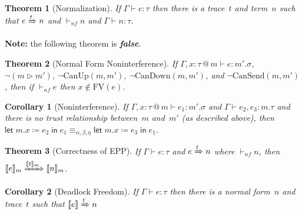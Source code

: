 \documentclass{article}
\makeatletter
\newtheorem{thm}{Theorem}
\newtheorem{cor}{Corollary}
\theoremstyle{definition}
\newcommand{\letl}[4]{\textsf{let}\;#1.#2 \mathrel{\coloneqq} #3 \mathrel{\textsf{in}} #4}
\newcommand{\at}{\ensuremath{\mathrel{@}}}
\newcommand{\reps}[2]{#1 \mathrel{\vartriangleright} #2}
\newcommand{\cansend}[2]{\text{CanSend}(#1, #2)}
\newcommand{\candown}[2]{\text{CanDown}(#1, #2)}
\newcommand{\canup}[2]{\text{CanUp}(#1, #2)}
\makeatother
\begin{document}
\begin{thm}[Normalization]
  If $\Gamma \vdash e : \tau$ then there is a trace~$t$ and term~$n$ such that $e \xRightarrow{t} n$ and $\vdash_{nf} n$ and $\Gamma \vdash n : \tau$.
\end{thm}

\noindent\textbf{Note:} the following theorem is \emph{\textbf{false}}.
\vspace{-0.5em}
\begin{thm}[Normal Form Noninterference]
  If\/ $\Gamma, x : \tau \at m \vdash e : m'.\sigma$, $\lnot (\reps{m}{m'})$, $\lnot\canup{m}{m'}$, $\lnot\candown{m}{m'}$, and $\lnot\cansend{m}{m'}$, then if\/ $\vdash_{nf} e$ then $x \not\in \text{FV}(e)$.
\end{thm}


\begin{cor}[Noninterference]
  If\/ $\Gamma, x : \tau \at m \vdash e_1 : m'.\sigma$ and $\Gamma \vdash e_2, e_3 : m.\tau$ and there is no trust relationship between~$m$ and~$m'$ (as described above), then $\letl{m}{x}{e_2}{e_1} \equiv_{\alpha, \beta, \eta} \letl{m}{x}{e_3}{e_1}$.
\end{cor}

\begin{thm}[Correctness of EPP]
  If\/ $\Gamma \vdash e : \tau$ and $e \xRightarrow{t} n$ where\/ $\vdash_{nf} n$, then $\llbracket e \rrbracket_m \xRightarrow{\llbracket t \rrbracket_m} \llbracket n \rrbracket_m$.
\end{thm}

\begin{cor}[Deadlock Freedom]
  If\/ $\Gamma \vdash e : \tau$ then there is a normal form~$n$ and trace~$t$ such that $\llbracket e \rrbracket \xRightarrow{t} n$
\end{cor}
\end{document}
